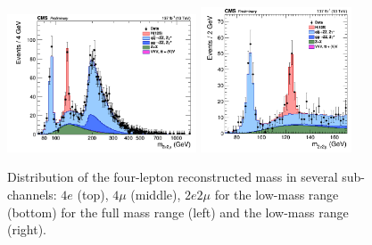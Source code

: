 {\begin{figure}[!htb]
\begin{center}
		\includegraphics[width=0.5\textwidth]{Figures/KinDistr/M4lMain_Unblinded_2e2mu_InclusiveRun2.png}
		\includegraphics[width=0.4\textwidth]{Figures/KinDistr/M4lMainZoomed_Unblinded_2e2mu_InclusiveRun2.png}\\
		\caption{ Distribution of the four-lepton reconstructed mass in several sub-channels: $4e$ (top), $4\mu$ (middle), $2e2\mu$ for the low-mass range (bottom) for the full mass range (left) and the low-mass range (right).
			\label{fig:Mass4l-2C}}
	\end{center}
\end{figure}

}
